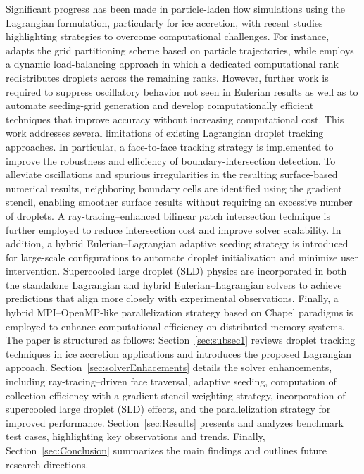 Significant progress has been made in particle-laden flow simulations using the Lagrangian formulation, particularly for ice accretion, with recent studies highlighting strategies to overcome computational challenges. For instance, \cite{BALDAN2023105856} adapts the grid partitioning scheme based on particle trajectories, while \cite{sabri2024study} employs a dynamic load-balancing approach in which a dedicated computational rank redistributes droplets across the remaining ranks. However, further work is required to suppress oscillatory behavior \cite{Moula_2023} not seen in Eulerian results as well as to automate seeding-grid generation and develop computationally efficient techniques that improve accuracy without increasing computational cost. This work addresses several limitations of existing Lagrangian droplet tracking approaches. In particular, a face-to-face tracking strategy is implemented to improve the robustness and efficiency of boundary-intersection detection. To alleviate oscillations and spurious irregularities in the resulting surface-based numerical results, neighboring boundary cells are identified using the gradient stencil, enabling smoother surface results without requiring an excessive number of droplets. A ray-tracing–enhanced bilinear patch intersection technique is further employed to reduce intersection cost and improve solver scalability. In addition, a hybrid Eulerian–Lagrangian adaptive seeding strategy is introduced for large-scale configurations to automate droplet initialization and minimize user intervention. Supercooled large droplet (SLD) physics are incorporated in both the standalone Lagrangian and hybrid Eulerian–Lagrangian solvers to achieve predictions that align more closely with experimental observations. Finally, a hybrid MPI–OpenMP-like parallelization strategy based on Chapel paradigms is employed to enhance computational efficiency on distributed-memory systems. The paper is structured as follows: Section~\ref{sec:subsec1} reviews droplet tracking techniques in ice accretion applications and introduces the proposed Lagrangian approach. Section~\ref{sec:solverEnhacements} details the solver enhancements, including ray-tracing–driven face traversal, adaptive seeding, computation of collection efficiency with a gradient-stencil weighting strategy, incorporation of supercooled large droplet (SLD) effects, and the parallelization strategy for improved performance. Section~\ref{sec:Results} presents and analyzes benchmark test cases, highlighting key observations and trends. Finally, Section~\ref{sec:Conclusion} summarizes the main findings and outlines future research directions.

